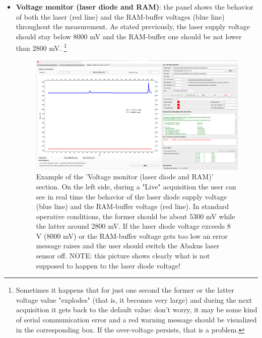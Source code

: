 \documentclass[a4paper, 11pt]{report}
\begin{document}
\begin{itemize}
\item \textbf{Voltage monitor (laser diode and RAM)}: the panel shows the behavior of both the laser (red line) and the RAM-buffer voltages (blue line) throughout the measurement. As stated previously, the laser supply voltage should stay below 8000 mV and the RAM-buffer one should be not lower than 2800 mV. \footnote{Sometimes it happens that for just one second the former or the latter voltage value "explodes" (that is, it becomes very large) and during the next acquisition it gets back to the default value: don't worry, it may be some kind of serial communication error and a red warning message should be visualized in the corresponding box. If the over-voltage persists, that is a problem.}
\begin{figure}[!hp]
	\centering
	\includegraphics[scale=0.3]{voltage_measure.png}
	\caption{Example of the 'Voltage monitor (laser diode and RAM)' section. On the left side, during a "Live" acquisition the user can see in real time the behavior of the laser diode supply voltage (blue line) and the RAM-buffer voltage (red line). In standard operative conditions, the former should be about 5300 mV while the latter around 2800 mV. If the laser diode voltage exceeds 8 V (8000 mV) or the RAM-buffer voltage gets too low an error message raises and the user should switch the Abakus laser sensor off. NOTE: this picture shows clearly what is not supposed to happen to the laser diode voltage!}
	\label{abakus_software2}
\end{figure}
\end{itemize}
\end{document}
